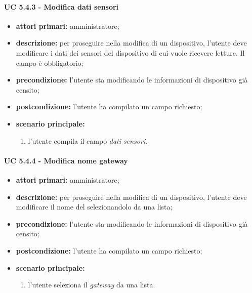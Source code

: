 				\paragraph{UC 5.4.3 - Modifica dati sensori}
				\begin{itemize}
					\item \textbf{attori primari:} amministratore;
					\item \textbf{descrizione:} per proseguire nella modifica di un dispositivo, l'utente deve modificare i dati dei sensori del dispositivo di cui vuole ricevere letture. Il campo è obbligatorio;
					\item \textbf{precondizione:} l'utente sta modificando le informazioni di dispositivo già censito;
					\item \textbf{postcondizione:} l'utente ha compilato un campo richiesto;
					\item \textbf{scenario principale:}
					\begin{enumerate}
						\item{l'utente compila il campo \textit{dati sensori}.}
					\end{enumerate}
				\end{itemize}

				\paragraph{UC 5.4.4 - Modifica nome gateway}
				\begin{itemize}
					\item \textbf{attori primari:} amministratore;
					\item \textbf{descrizione:} per proseguire nella modifica di un dispositivo, l'utente deve modificare il nome del  selezionandolo da una lista;
					\item \textbf{precondizione:} l'utente sta modificando le informazioni di dispositivo già censito;
					\item \textbf{postcondizione:} l'utente ha compilato un campo richiesto;
					\item \textbf{scenario principale:}
					\begin{enumerate}
						\item{l'utente seleziona il \textit{gateway} da una lista.}
					\end{enumerate}
				\end{itemize}

